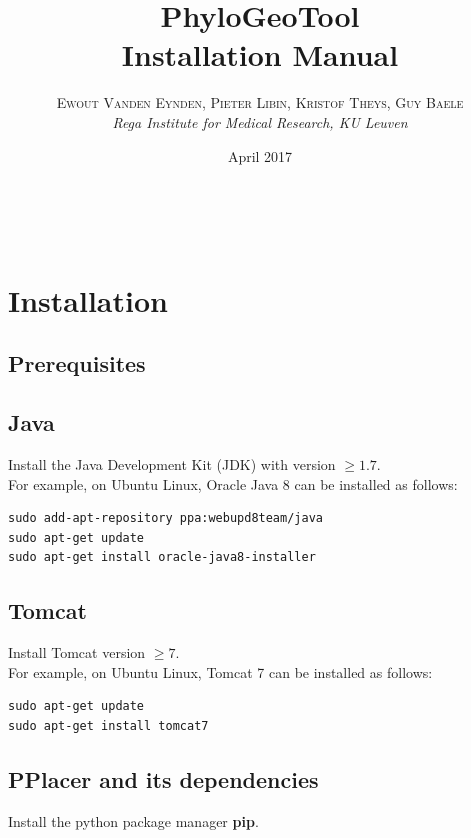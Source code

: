 \documentclass[a4paper, 11pt]{article} %
\title{\textbf{PhyloGeoTool}\\ %
Installation Manual} %
\author{\textsc{Ewout Vanden Eynden, Pieter Libin, Kristof Theys, Guy Baele} %
\\{\textit{Rega Institute for Medical Research, KU Leuven}}} %
\date{April 2017} %
\makeatletter
\renewcommand{\maketitle}{ %
\begin{flushright} %
{\LARGE\@title} %

\vspace{50pt} %

{\large\@author} %
\\\@date %

\vspace{40pt} %
\end{flushright}
}
\makeatother
\begin{document}
\maketitle %

\vspace{30pt} %

\tableofcontents
\newpage


\section{Installation}
\subsection{Prerequisites}
\subsection*{Java}
Install the Java Development Kit (JDK) with version $\geq 1.7$.\\

\noindent For example, on Ubuntu Linux, Oracle Java 8 can be installed as follows:
\begin{verbatim} 
sudo add-apt-repository ppa:webupd8team/java
sudo apt-get update
sudo apt-get install oracle-java8-installer
\end{verbatim}

\subsection*{Tomcat}
Install Tomcat version $\geq 7$.\\

\noindent For example, on Ubuntu Linux, Tomcat 7 can be installed as follows:
\begin{verbatim}
sudo apt-get update
sudo apt-get install tomcat7
\end{verbatim}


\subsection*{PPlacer and its dependencies}
 Install the python package manager \textbf{pip}. \\
\end{document}
